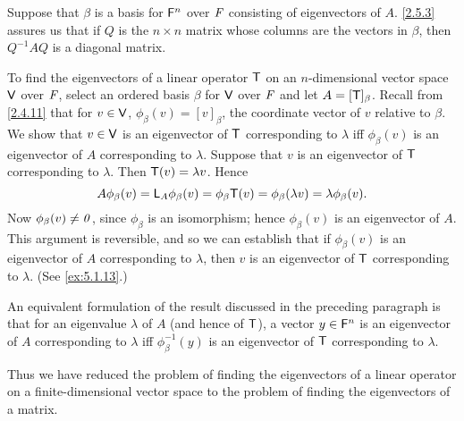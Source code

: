 \begin{note}
  Suppose that \(\beta\) is a basis for \(\mathsf{F}^n\) over \(\mathit{F}\) consisting of eigenvectors of \(A\).
  \cref{2.5.3} assures us that if \(Q\) is the \(n \times n\) matrix whose columns are the vectors in \(\beta\), then \(Q^{-1} A Q\) is a diagonal matrix.

  To find the eigenvectors of a linear operator \(\mathsf{T}\) on an \(n\)-dimensional vector space \(\mathsf{V}\) over \(\mathit{F}\), select an ordered basis \(\beta\) for \(\mathsf{V}\) over \(\mathit{F}\) and let \(A = [\mathsf{T}]_{\beta}\).
  Recall from \cref{2.4.11} that for \(v \in \mathsf{V}\), \(\phi_{\beta}(v) = [v]_{\beta}\), the coordinate vector of \(v\) relative to \(\beta\).
  We show that \(v \in \mathsf{V}\) is an eigenvector of \(\mathsf{T}\) corresponding to \(\lambda\) iff \(\phi_{\beta}(v)\) is an eigenvector of \(A\) corresponding to \(\lambda\).
  Suppose that \(v\) is an eigenvector of \(\mathsf{T}\) corresponding to \(\lambda\).
  Then \(\mathsf{T}(v) = \lambda v\).
  Hence
  \[
    A \phi_{\beta}(v) = \mathsf{L}_A \phi_{\beta}(v) = \phi_{\beta} \mathsf{T}(v) = \phi_{\beta}(\lambda v) = \lambda \phi_{\beta}(v).
  \]
  Now \(\phi_{\beta}(v) \neq \mathit{0}\), since \(\phi_{\beta}\) is an isomorphism;
  hence \(\phi_{\beta}(v)\) is an eigenvector of \(A\).
  This argument is reversible, and so we can establish that if \(\phi_{\beta}(v)\) is an eigenvector of \(A\) corresponding to \(\lambda\), then \(v\) is an eigenvector of \(\mathsf{T}\) corresponding to \(\lambda\).
  (See \cref{ex:5.1.13}.)

  An equivalent formulation of the result discussed in the preceding paragraph is that for an eigenvalue \(\lambda\) of \(A\) (and hence of \(\mathsf{T}\)), a vector \(y \in \mathsf{F}^n\) is an eigenvector of \(A\) corresponding to \(\lambda\) iff \(\phi_{\beta}^{-1}(y)\) is an eigenvector of \(\mathsf{T}\) corresponding to \(\lambda\).

  Thus we have reduced the problem of finding the eigenvectors of a linear operator on a finite-dimensional vector space to the problem of finding the eigenvectors of a matrix.
\end{note}

